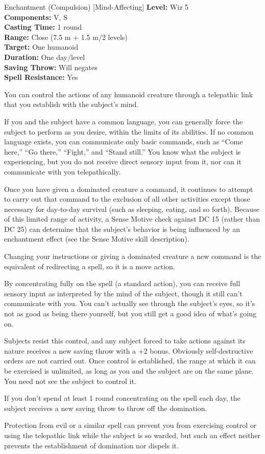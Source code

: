 {Enchantment (Compulsion) [Mind-Affecting]}
{
	\textbf{Level:}
	Wiz 5\\
	\textbf{Components:}
	V, S\\
	\textbf{Casting Time:}
	1 round\\
	\textbf{Range:}
	Close (7.5 m + 1.5 m/2 levels)\\
	\textbf{Target:}
	One humanoid\\
	\textbf{Duration:}
	One day/level\\
	\textbf{Saving Throw:}
	Will negates\\
	\textbf{Spell Resistance:}
	Yes\\
}
{
	You can control the actions of any humanoid creature through a telepathic link that you establish with the subject's mind.

	If you and the subject have a common language, you can generally force the subject to perform as you desire, within the limits of its abilities. If no common language exists, you can communicate only basic commands, such as ``Come here,'' ``Go there,'' ``Fight,'' and ``Stand still.'' You know what the subject is experiencing, but you do not receive direct sensory input from it, nor can it communicate with you telepathically.

	Once you have given a dominated creature a command, it continues to attempt to carry out that command to the exclusion of all other activities except those necessary for day-to-day survival (such as sleeping, eating, and so forth). Because of this limited range of activity, a Sense Motive check against DC 15 (rather than DC 25) can determine that the subject's behavior is being influenced by an enchantment effect (see the Sense Motive skill description).

	Changing your instructions or giving a dominated creature a new command is the equivalent of redirecting a spell, so it is a move action.

	By concentrating fully on the spell (a standard action), you can receive full sensory input as interpreted by the mind of the subject, though it still can't communicate with you. You can't actually see through the subject's eyes, so it's not as good as being there yourself, but you still get a good idea of what's going on.

	Subjects resist this control, and any subject forced to take actions against its nature receives a new saving throw with a +2 bonus. Obviously self-destructive orders are not carried out. Once control is established, the range at which it can be exercised is unlimited, as long as you and the subject are on the same plane. You need not see the subject to control it.

	If you don't spend at least 1 round concentrating on the spell each day, the subject receives a new saving throw to throw off the domination.

Protection from evil or a similar spell can prevent you from exercising control or using the telepathic link while the subject is so warded, but such an effect neither prevents the establishment of domination nor dispels it.

}
